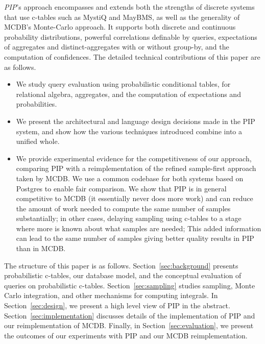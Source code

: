 {\em PIP}\/'s approach encompasses and extends both the strengths of discrete systems that use c-tables such as MystiQ and MayBMS, as well as the generality of MCDB's Monte-Carlo approach.  It supports both discrete and continuous probability distributions, powerful correlations definable by queries, expectations of aggregates and distinct-aggregates with or without  group-by,  and the computation of confidences. The detailed technical contributions of this paper are as follows.


\begin{itemize}
\addtolength{\topsep}{-0.3ex}
\addtolength{\labelsep}{-0.3ex}
\addtolength{\itemsep}{-1ex}
\item
We study query evaluation using probabilistic conditional tables, for
relational algebra, aggregates, and the computation of expectations and
probabilities.

\item
We present the architectural and language design decisions made in the
PIP system, and show how the various techniques introduced combine into
a unified whole.

\item
We provide experimental evidence for the competitiveness of our approach, comparing PIP with a reimplementation of the refined sample-first approach taken by MCDB.  We use a common codebase for both systems based on Postgres to enable fair comparison. We show that PIP is in general competitive to MCDB (it essentially never does more work) and can reduce the amount of work needed to compute the same number of samples substantially; in other cases, delaying sampling using c-tables to a stage where more is known about what samples are needed; This added information can lead to the same number of samples giving better quality results in PIP than in MCDB.
\end{itemize}

The structure of this paper is as follows. Section~\ref{sec:background} presents probabilistic c-tables, our database model, and the conceptual  evaluation of queries on probabilistic c-tables. Section~\ref{sec:sampling} studies sampling, Monte
Carlo integration, and other mechanisms for computing integrals.  In Section~\ref{sec:design}, we present a high level view of PIP in the abstract.   Section~\ref{sec:implementation} discusses details of the implementation of PIP and our reimplementation of MCDB.  Finally, in Section~\ref{sec:evaluation}, we present the outcomes of our experiments with PIP and our MCDB reimplementation.
